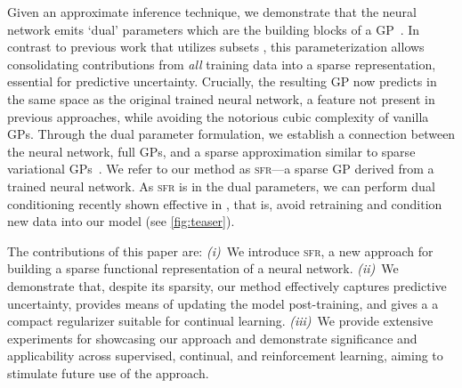 \documentclass{article}
\newcommand{\our}{\textsc{sfr}\xspace}
\begin{document}
Given an approximate inference technique, we demonstrate that the neural network emits `dual' parameters which are the building blocks of a GP~\cite{csato2002sparse, adam2021dual, chang2020fast}. In contrast to previous work that utilizes subsets \cite{immer2021scalable}, this parameterization allows consolidating contributions from {\em all} training data into a sparse representation, essential for predictive uncertainty. Crucially, the resulting GP now predicts in the same space as the original trained neural network, a feature not present in previous approaches, while avoiding the notorious cubic complexity of vanilla GPs. Through the dual parameter formulation, we establish a connection between the neural network, full GPs, and a sparse approximation similar to sparse variational GPs~\cite{titsias2009variational}. We refer to our method as \our---a sparse GP derived from a trained neural network. As \our is in the dual parameters, we can perform dual conditioning recently shown effective in \cite{chang2022fantasizing}, that is, avoid retraining and condition new data into our model (see \cref{fig:teaser}).


The contributions of this paper are:
%
{\em (i)}~We introduce \our, a new approach for building a sparse functional representation of a neural network.
{\em (ii)}~We demonstrate that, despite its sparsity, our method effectively captures predictive uncertainty, provides means of updating the model post-training, and gives a a compact regularizer suitable for continual learning.
{\em (iii)}~We provide extensive experiments for showcasing our approach and demonstrate significance and applicability across supervised, continual, and reinforcement learning, aiming to stimulate future use of the approach.

\end{document}
